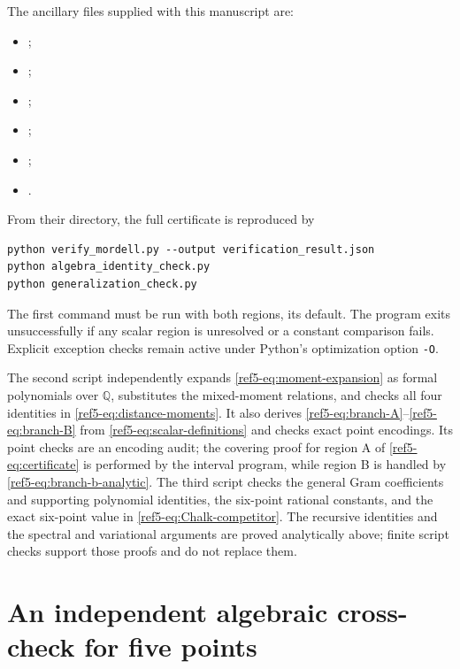 \documentclass[11pt]{article}
\theoremstyle{remark}
\newcommand{\Q}{\mathbb Q}
\numberwithin{equation}{section}
\begin{document}
\noindent\begin{minipage}{\textwidth}
The ancillary files supplied with this manuscript are:
\begin{itemize}
\item {};
\item {};
\item {};
\item {};
\item {};
\item {}.
\end{itemize}
\end{minipage}
From their directory, the full certificate is reproduced by
\begin{verbatim}
python verify_mordell.py --output verification_result.json
python algebra_identity_check.py
python generalization_check.py
\end{verbatim}
The first command must be run with both regions, its default.
The program exits unsuccessfully if any scalar region is unresolved
or a constant comparison fails. Explicit exception checks remain active
under Python's optimization option \texttt{-O}.

The second script independently expands \eqref{ref5-eq:moment-expansion}
as formal polynomials over $\Q$, substitutes the mixed-moment
relations, and checks all four identities in
\eqref{ref5-eq:distance-moments}. It also derives
\eqref{ref5-eq:branch-A}--\eqref{ref5-eq:branch-B} from
\eqref{ref5-eq:scalar-definitions} and checks exact point encodings.
Its point checks are an encoding audit; the covering proof for region A
of \eqref{ref5-eq:certificate} is performed by the interval program, while
region B is handled by \eqref{ref5-eq:branch-b-analytic}.
The third script checks the general Gram coefficients and supporting
polynomial identities, the six-point rational constants, and the
exact six-point value in \eqref{ref5-eq:Chalk-competitor}.
The recursive identities and the spectral and variational arguments
are proved analytically above; finite script checks support those
proofs and do not replace them.


\section{An independent algebraic cross-check for five points}
\label{sec:n5-complete-improved}
\end{document}
